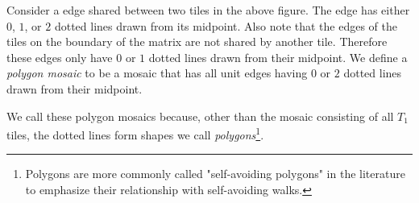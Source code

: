 \documentclass[12pt]{article}
\theoremstyle{plain}
\theoremstyle{definition}
\theoremstyle{remark}
\theoremstyle{definition}
\newcommand{\cell}[4]{ \draw[thick] ( #1 , #2 ) rectangle ( #3 , #4 );}
\newcommand{\cellA}[4]{ \draw[thick] ( #1 , #2 ) rectangle ( #3 , #4 ); \draw[red, thick, densely dotted] (#3 * 0.5 + #1 * 0.5 , #2) -- (#3, #4 * 0.5 + #2 * 0.5);}
\newcommand{\cellB}[4]{ \draw[thick] ( #1 , #2 ) rectangle ( #3 , #4 ); \draw[red, thick, densely dotted] (#3 * 0.5 + #1 * 0.5 , #2) -- (#1, #4 * 0.5 + #2 * 0.5);}
\newcommand{\cellC}[4]{ \draw[thick] ( #1 , #2 ) rectangle ( #3 , #4 ); \draw[red, thick, densely dotted] (#3 * 0.5 + #1 * 0.5 , #4) -- (#1, #4 * 0.5 + #2 * 0.5);}
\newcommand{\cellD}[4]{ \draw[thick] ( #1 , #2 ) rectangle ( #3 , #4 ); \draw[red, thick, densely dotted] (#3 * 0.5 + #1 * 0.5 , #4) -- (#3, #4 * 0.5 + #2 * 0.5);}
\newcommand{\cellE}[4]{ \draw[thick] ( #1 , #2 ) rectangle ( #3 , #4 ); \draw[red, thick, densely dotted] (#3 * 0.5 + #1 * 0.5 , #2) -- (#3 * 0.5 + #1 * 0.5 , #4);}
\newcommand{\cellF}[4]{ \draw[thick] ( #1 , #2 ) rectangle ( #3 , #4 ); \draw[red, thick, densely dotted] (#3, #4 * 0.5 + #2 * 0.5) -- (#1, #4 * 0.5 + #2 * 0.5);}
\begin{document}
\begin{center}
\end{center}

Consider a edge shared between two tiles in the above figure. The edge has either $0$, $1$, or $2$ dotted lines drawn from its midpoint. Also note that the edges of the tiles on the boundary of the matrix are not shared by another tile. Therefore these edges only have $0$ or $1$ dotted lines drawn from their midpoint. We define a \textit{polygon mosaic} to be a mosaic that has all unit edges having $0$ or $2$ dotted lines drawn from their midpoint.

We call these polygon mosaics because, other than the mosaic consisting of all $T_1$ tiles, the dotted lines form shapes we call \textit{polygons}\footnote{Polygons are more commonly called "self-avoiding polygons" in the literature to emphasize their relationship with self-avoiding walks.}. 
\end{document}
